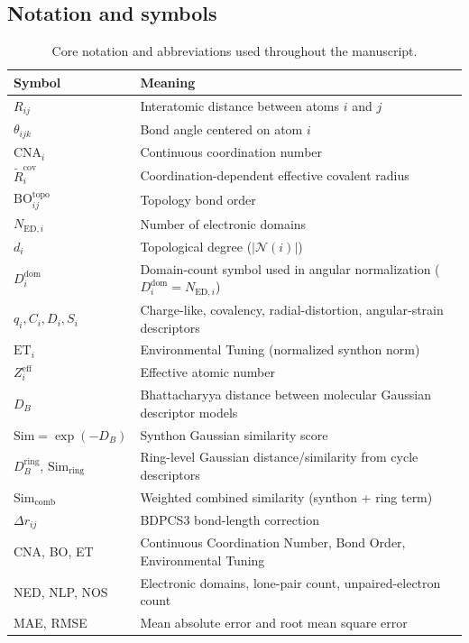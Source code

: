 \documentclass[journal=jctcce,manuscript=article]{achemso}
\begin{document}
\subsection{Notation and symbols}
\begin{table}[ht]
\caption{Core notation and abbreviations used throughout the manuscript.}
\label{tab:notation}
\centering
\begin{tabular}{ll}
\toprule
Symbol & Meaning \\
\midrule
$R_{ij}$ & Interatomic distance between atoms $i$ and $j$ \\
$\theta_{ijk}$ & Bond angle centered on atom $i$ \\
$\mathrm{CNA}_i$ & Continuous coordination number \\
$\tilde R_i^{\mathrm{cov}}$ & Coordination-dependent effective covalent radius \\
$\mathrm{BO}_{ij}^{\mathrm{topo}}$ & Topology bond order \\
$N_{\mathrm{ED},i}$ & Number of electronic domains \\
$d_i$ & Topological degree ($|\mathcal{N}(i)|$) \\
$D_i^{\mathrm{dom}}$ & Domain-count symbol used in angular normalization ($D_i^{\mathrm{dom}}=N_{\mathrm{ED},i}$) \\
$q_i, C_i, D_i, S_i$ & Charge-like, covalency, radial-distortion, angular-strain descriptors \\
$\mathrm{ET}_i$ & Environmental Tuning (normalized synthon norm) \\
$Z_i^{\mathrm{eff}}$ & Effective atomic number \\
$D_B$ & Bhattacharyya distance between molecular Gaussian descriptor models \\
$\mathrm{Sim}=\exp(-D_B)$ & Synthon Gaussian similarity score \\
$D_B^{\mathrm{ring}}$, $\mathrm{Sim}_{\mathrm{ring}}$ & Ring-level Gaussian distance/similarity from cycle descriptors \\
$\mathrm{Sim}_{\mathrm{comb}}$ & Weighted combined similarity (synthon + ring term) \\
$\Delta r_{ij}$ & BDPCS3 bond-length correction \\
CNA, BO, ET & Continuous Coordination Number, Bond Order, Environmental Tuning \\
NED, NLP, NOS & Electronic domains, lone-pair count, unpaired-electron count \\
MAE, RMSE & Mean absolute error and root mean square error \\
\bottomrule
\end{tabular}
\end{table}
\end{document}
